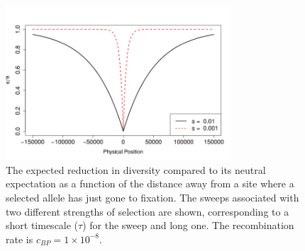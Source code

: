 \begin{figure}
\begin{center}
\includegraphics[width=0.75\textwidth]{figures/hitchhiking_reduction.png}
\end{center}
\caption{The expected reduction in diversity compared to its neutral expectation as
a function of the distance away from a site where a selected allele
has just gone to fixation. The sweeps associated with two different strengths of selection are shown, corresponding to a short timescale ($\tau$) for the sweep and long one. The recombination rate is $c_{BP}= 1\times
10^{-8}$. } \label{fig:hitchhiking_reduction}
\end{figure}


